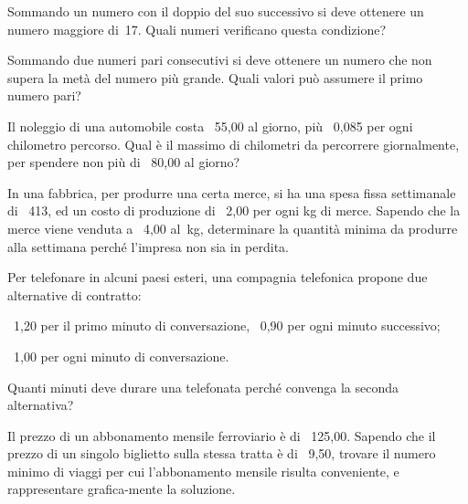 \begin{multicols}{2}
\begin{esercizio}[\Ast]
 \label{ese:21.16}
 Sommando un numero con il doppio del suo successivo si deve ottenere
un numero maggiore di~17. Quali numeri verificano questa
condizione?
\end{esercizio}

 \begin{esercizio}[\Ast]
 \label{ese:21.17}
 Sommando due numeri pari consecutivi si deve ottenere un numero che
non supera la metà del numero più grande. Quali valori può
assumere il primo numero pari?
 \end{esercizio}

 \begin{esercizio}[\Ast]
 \label{ese:21.18}
 Il noleggio di una automobile costa \officialeuro\ 55,00 al giorno, più
\officialeuro\ 0,085 per ogni chilometro percorso. Qual è il massimo di
chilometri da percorrere giornalmente, per spendere non più di \officialeuro\ 80,00 al giorno?
 \end{esercizio}

 \begin{esercizio}
 \label{ese:21.19}
 In una fabbrica, per produrre una certa merce, si ha
una spesa fissa settimanale di \officialeuro\ 413, ed un costo di produzione di \officialeuro\ 2,00 per ogni
kg di merce. Sapendo che la merce viene venduta a \officialeuro\ 4,00 al~kg, determinare la quantità minima da produrre
alla settimana perché l'impresa non sia in perdita.
 \end{esercizio}

 \begin{esercizio}[\Ast]
 \label{ese:21.20}
 Per telefonare in alcuni paesi esteri, una compagnia telefonica
propone due alternative di contratto:
\begin{enumeratea}
 \item \officialeuro\ 1,20 per il primo minuto di conversazione, \officialeuro\ 0,90 per ogni minuto successivo;
\item \officialeuro\ 1,00 per ogni minuto di conversazione.
\end{enumeratea}
Quanti minuti deve durare una telefonata perché convenga la seconda
alternativa?
 \end{esercizio}

\begin{esercizio}[\Ast]
 \label{ese:21.21}
 Il prezzo di un abbonamento mensile ferroviario è di \officialeuro\ 125,00.
 Sapendo che il prezzo di un singolo biglietto sulla stessa
tratta è di \officialeuro\ 9,50, trovare il numero minimo di viaggi per
cui l'abbonamento mensile risulta conveniente, e
rappresentare grafica-mente la soluzione.
 \end{esercizio}


\end{multicols}
